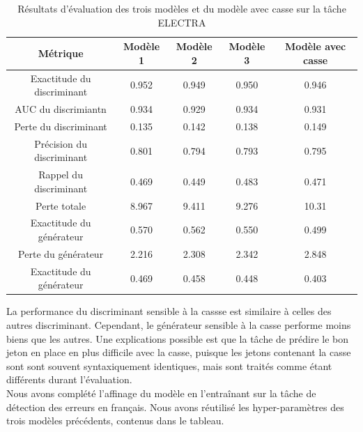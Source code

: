 \documentclass[12pt,twoside,maitrise]{dms}
\theoremstyle{definition}
\numberwithin{equation}{section}
\numberwithin{table}{chapter}
\numberwithin{figure}{chapter}
\begin{document}
\begin{table}[h!]
	\centering
	\begin{tabular}{||c | c c c c||}
		\hline
		Métrique                   & Modèle 1 & Modèle 2 & Modèle 3 & Modèle avec casse \\ [0.5ex]
		\hline\hline
		Exactitude du discriminant & 0.952    & 0.949    & 0.950    & 0.946             \\
		AUC du discrimiantn        & 0.934    & 0.929    & 0.934    & 0.931             \\
		Perte du discriminant      & 0.135    & 0.142    & 0.138    & 0.149             \\
		Précision du discriminant  & 0.801    & 0.794    & 0.793    & 0.795             \\
		Rappel du discriminant     & 0.469    & 0.449    & 0.483    & 0.471             \\
		Perte totale               & 8.967    & 9.411    & 9.276    & 10.31             \\
		Exactitude du générateur   & 0.570    & 0.562    & 0.550    & 0.499             \\
		Perte du générateur        & 2.216    & 2.308    & 2.342    & 2.848             \\
		Exactitude du générateur   & 0.469    & 0.458    & 0.448    & 0.403             \\
		\hline
	\end{tabular}
	\caption{Résultats d'évaluation des trois modèles et du modèle avec casse sur la tâche ELECTRA}
	\label{table:respreentrainementaveccasse}
\end{table}

La performance du discriminant sensible à la cassse est similaire à celles des
autres discriminant. Cependant, le générateur sensible à la casse performe
moins biens que les autres. Une explications possible est que la tâche de
prédire le bon jeton en place en plus difficile avec la casse, puisque les
jetons contenant la casse sont sont souvent syntaxiquement identiques, mais
sont traités comme étant différents durant l'évaluation.\\

Nous avons complété l'affinage du modèle en l'entraînant sur la tâche de
détection des erreurs en français. Nous avons réutilisé les hyper-paramètres
des trois modèles précédents, contenus dans le tableau.
\end{document}
